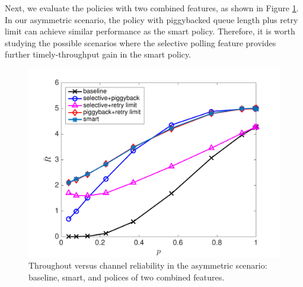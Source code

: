 \documentclass{article}
\begin{document}
Next, we evaluate the policies with two combined features, as shown in Figure \ref{sim: asym: combined}. In our asymmetric scenario, the policy with piggybacked queue length plus retry limit can achieve similar performance as the smart policy. Therefore, it is worth studying the possible scenarios where the selective polling feature provides further timely-throughput gain in the smart policy.

\begin{figure}[htbp]
\centering
\includegraphics[scale=0.5]{asym_threecombinepolicys.pdf}
\caption{Throughout versus channel reliability in the asymmetric scenario: baseline, smart, and polices of two combined features.}
\label{sim: asym: combined}
\end{figure}

\end{document}
